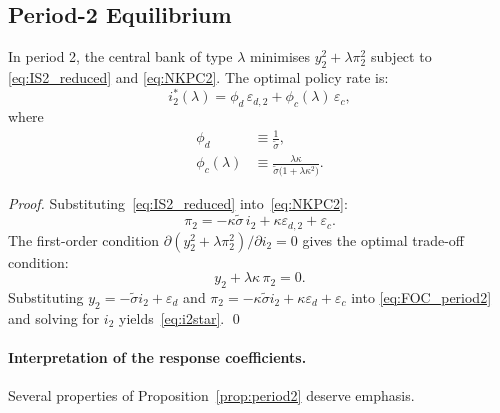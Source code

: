 \subsection{Period-2 Equilibrium}
\label{sec:period2}

\begin{proposition}
\label{prop:period2}
In period 2, the central bank of type $\lambda$ minimises $y_2^2 + \lambda\pi_2^2$
subject to \eqref{eq:IS2_reduced} and \eqref{eq:NKPC2}. The optimal policy rate is:
\begin{equation}
  i_2^*(\lambda) = \phi_d\,\varepsilon_{d,2} + \phi_c(\lambda)\,\varepsilon_{c},
  \label{eq:i2star}
\end{equation}
where
\begin{align}
  \phi_d &\equiv \frac{1}{\tilde{\sigma}},
  \label{eq:phi_d}\\[4pt]
  \phi_c(\lambda) &\equiv
    \frac{\lambda\kappa}{\tilde{\sigma}\bigl(1 + \lambda\kappa^2\bigr)}.
  \label{eq:phi_c}
\end{align}
\end{proposition}

\begin{proof}
Substituting~\eqref{eq:IS2_reduced} into~\eqref{eq:NKPC2}:
\begin{equation*}
  \pi_2 = -\kappa\tilde{\sigma}\,i_2 + \kappa\varepsilon_{d,2} + \varepsilon_c.
\end{equation*}
The first-order condition $\partial(y_2^2 + \lambda\pi_2^2)/\partial i_2 = 0$ gives the
optimal trade-off condition:
\begin{equation}
  y_2 + \lambda\kappa\,\pi_2 = 0.
  \label{eq:FOC_period2}
\end{equation}
Substituting $y_2 = -\tilde{\sigma}i_2 + \varepsilon_d$ and
$\pi_2 = -\kappa\tilde{\sigma}i_2 + \kappa\varepsilon_d + \varepsilon_c$ into
\eqref{eq:FOC_period2} and solving for $i_2$ yields~\eqref{eq:i2star}. \qed
\end{proof}

\paragraph{Interpretation of the response coefficients.}
Several properties of Proposition~\ref{prop:period2} deserve emphasis.

